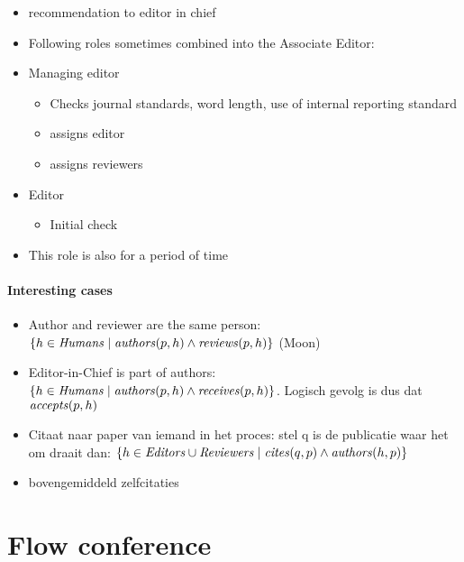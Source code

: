 {\begin{itemize}
    \item recommendation to editor in chief
    \item Following roles sometimes combined into the Associate Editor:
    \item Managing editor
    \begin{itemize}
        \item Checks journal standards, word length, use of internal reporting standard
        \item assigns editor
        \item assigns reviewers
    \end{itemize}
    \item Editor
    \begin{itemize}
        \item Initial check
    \end{itemize}
    \item This role is also for a period of time
\end{itemize}

\paragraph{Interesting cases}




\begin{itemize}
    \item Author and reviewer are the same person: $\{h \in \mathit{Humans} \mid \mathit{authors}(p, h) \land \mathit{reviews}(p, h)\}$ (Moon)
    \item Editor-in-Chief is part of authors: $\{h \in \mathit{Humans} \mid \mathit{authors}(p, h) \land \mathit{receives}(p, h)\}$. Logisch gevolg is dus dat $\mathit{accepts}(p, h)$
    \item Citaat naar paper van iemand in het proces: stel q is de publicatie waar het om draait dan:
    $\{h \in \mathit{Editors} \cup \mathit{Reviewers} \mid \mathit{cites}(q, p) \land \mathit{authors}(h, p)\}$
    \item bovengemiddeld zelfcitaties
\end{itemize}

}


\section{Flow conference}
